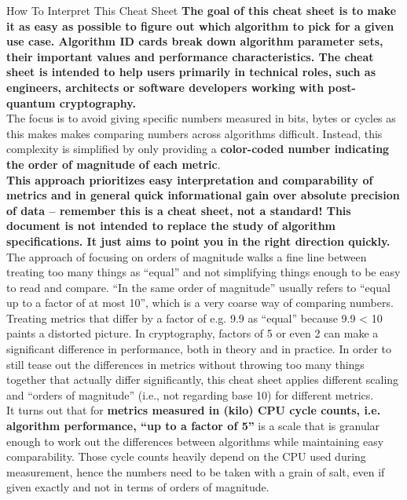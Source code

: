 \begin{minipage}[t]{0.58\textwidth} %
    \vspace{-3mm}
    \begin{algorithmbox}{How To Interpret This Cheat Sheet}
        \scriptsize
        {\bfseries The goal of this cheat sheet is to make it as easy as possible to figure out which algorithm to pick for a given use case. Algorithm ID cards break down algorithm parameter sets, their important values and performance characteristics. The cheat sheet is intended to help users primarily in technical roles, such as engineers, architects or software developers working with post-quantum cryptography.}\\[\baselineskip]

        The focus is to avoid giving specific numbers measured in bits, bytes or cycles as this makes makes comparing numbers across algorithms difficult. Instead, this complexity is simplified by only providing a
        {\bfseries color-coded number indicating the order of magnitude of each metric}.\\[\baselineskip]

        {\bfseries This approach prioritizes easy interpretation and comparability of metrics and in general quick informational gain over absolute precision of data -- remember this is a cheat sheet, not a standard! This document is not intended to replace the study of algorithm specifications. It just aims to point you in the right direction quickly.}\\[\baselineskip]

        The approach of focusing on orders of magnitude walks a fine line between treating too many things as ``equal'' and not simplifying things enough to be easy to read and compare. ``In the same order of magnitude'' usually refers to ``equal up to a factor of at most 10'', which is a very coarse way of comparing numbers. Treating metrics that differ by a factor of e.g. 9.9 as ``equal'' because 9.9 < 10 paints a distorted picture. In cryptography, factors of 5 or even 2 can make a significant difference in performance, both in theory and in practice. In order to still tease out the differences in metrics without throwing too many things together that actually differ significantly, this cheat sheet applies different scaling and ``orders of magnitude'' (i.e., not regarding base 10) for different metrics.\\[\baselineskip]


        It turns out that for {\bfseries metrics measured in (kilo) CPU cycle counts, i.e. algorithm performance, ``up to a factor of 5''} is a scale that is granular enough to work out the differences between algorithms while maintaining easy comparability. Those cycle counts heavily depend on the CPU used during measurement, hence the numbers need to be taken with a grain of salt, even if given exactly and not in terms of orders of magnitude.\\[\baselineskip]


\end{algorithmbox}
\end{minipage}

